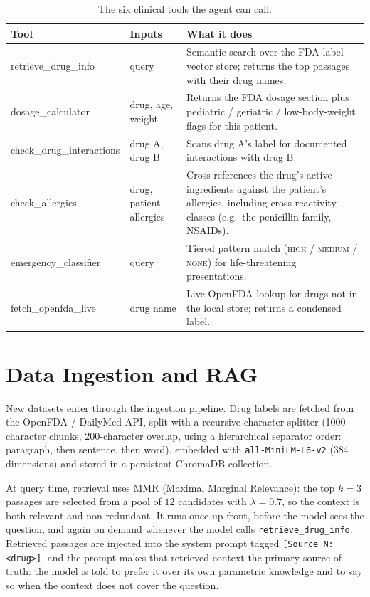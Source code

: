 \documentclass[11pt,a4paper]{article}
\begin{document}
\begin{table}[H]
\centering
\renewcommand{\arraystretch}{1.25}
\caption{The six clinical tools the agent can call.}
\begin{tabular}{@{}>{\ttfamily\footnotesize\raggedright\arraybackslash}p{}
                   >{\footnotesize\raggedright\arraybackslash}p{}
                   >{\raggedright\arraybackslash}p{}@{}}
\toprule
\normalfont\bfseries Tool & \normalfont\bfseries Inputs & \normalfont\bfseries What it does\\
\midrule
retrieve\_drug\_info & query & Semantic search over the FDA-label vector store; returns the top passages with their drug names.\\[3pt]
dosage\_calculator & drug, age, weight & Returns the FDA dosage section plus pediatric / geriatric / low-body-weight flags for this patient.\\[3pt]
check\_drug\_interactions & drug A, drug B & Scans drug A's label for documented interactions with drug B.\\[3pt]
check\_allergies & drug, patient allergies & Cross-references the drug's active ingredients against the patient's allergies, including cross-reactivity classes (e.g.\ the penicillin family, NSAIDs).\\[3pt]
emergency\_classifier & query & Tiered pattern match (\textsc{high} / \textsc{medium} / \textsc{none}) for life-threatening presentations.\\[3pt]
fetch\_openfda\_live & drug name & Live OpenFDA lookup for drugs not in the local store; returns a condensed label.\\
\bottomrule
\end{tabular}
\end{table}

\section{Data Ingestion and RAG}

New datasets enter through the ingestion pipeline. Drug labels are fetched from the OpenFDA / DailyMed
API, split with a recursive character splitter (1000-character chunks, 200-character overlap, using a
hierarchical separator order: paragraph, then sentence, then word), embedded with
\texttt{all-MiniLM-L6-v2} (384 dimensions) and stored in a persistent ChromaDB collection.

At query time, retrieval uses MMR (Maximal Marginal Relevance): the top $k=3$ passages are selected
from a pool of $12$ candidates with $\lambda=0.7$, so the context is both relevant and
non-redundant. It runs once up front, before the model sees the question, and again on demand whenever
the model calls \texttt{retrieve\_drug\_info}. Retrieved passages are injected into the system prompt
tagged \texttt{[Source N: <drug>]}, and the prompt makes that retrieved context the primary source of
truth: the model is told to prefer it over its own parametric knowledge and to say so when
the context does not cover the question.
\end{document}
